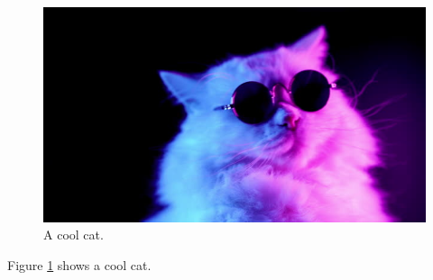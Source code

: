 \documentclass{article}
\begin{document}
\begin{figure}
	\includegraphics[width=\linewidth]{cool_cat.jpg}
	\caption{A cool cat.}
	\label{fig:cat1}
\end{figure}

Figure \ref{fig:cat1} shows a cool cat.
\end{document}
